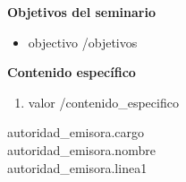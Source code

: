 \documentclass[spanish]{article}
\begin{document}
\textbf{Objetivos del seminario}
\begin{itemize}
{{#objetivos}}
\item {{objectivo}}
{{/objetivos}}
\end{itemize}

\vspace*{0.5cm}

\textbf{Contenido específico}
\begin{enumerate}
{{#contenido_especifico}}
\item {{valor}}
{{/contenido_especifico}}
\end{enumerate}

\vspace*{0.7cm}

\begin{center}
{{autoridad_emisora.cargo}}\\
\vspace*{3cm}
{{autoridad_emisora.nombre}}\\
{{autoridad_emisora.linea1}}
\end{center}
\end{document}
